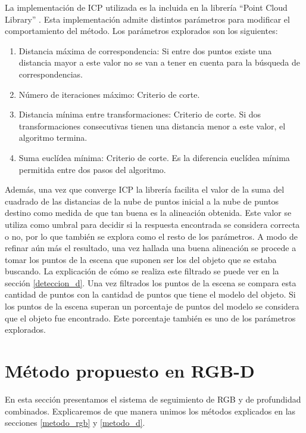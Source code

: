 La implementación de ICP utilizada es la incluida en la librería ``Point Cloud Library'' \cite{Rusu_ICRA2011_PCL}. Esta implementación admite distintos parámetros para modificar el comportamiento del método. Los parámetros explorados son los siguientes:

\begin{enumerate}
	\item Distancia máxima de correspondencia: Si entre dos puntos existe una distancia mayor a este valor no se van a tener en cuenta para la búsqueda de correspondencias.
	\item Número de iteraciones máximo: Criterio de corte.
	\item Distancia mínima entre transformaciones: Criterio de corte. Si dos transformaciones consecutivas tienen una distancia menor a este valor, el algoritmo termina.
	\item Suma euclídea mínima: Criterio de corte. Es la diferencia euclídea mínima permitida entre dos pasos del algoritmo.
\end{enumerate}

Además, una vez que converge ICP la librería facilita el valor de la suma del cuadrado de las distancias de la nube de puntos inicial a la nube de puntos destino como medida de que tan buena es la alineación obtenida. Este valor se utiliza como umbral para decidir si la respuesta encontrada se considera correcta o no, por lo que también se explora como el resto de los parámetros. A modo de refinar aún más el resultado, una vez hallada una buena alineación se procede a tomar los puntos de la escena que suponen ser los del objeto que se estaba buscando. La explicación de cómo se realiza este filtrado se puede ver en la sección \ref{deteccion_d}. Una vez filtrados los puntos de la escena se compara esta cantidad de puntos con la cantidad de puntos que tiene el modelo del objeto. Si los puntos de la escena superan un porcentaje de puntos del modelo se considera que el objeto fue encontrado. Este porcentaje también es uno de los parámetros explorados.




\section{Método propuesto en RGB-D}\label{metodo_rgbd}
En esta sección presentamos el sistema de seguimiento de RGB y de profundidad combinados. Explicaremos de que manera unimos los métodos explicados en las secciones \ref{metodo_rgb} y \ref{metodo_d}.

